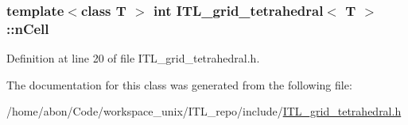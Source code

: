 \hypertarget{classITL__grid__tetrahedral_a4f290e007f6b76fc039de3faf68276df}{
\subsubsection[{nCell}]{\setlength{\rightskip}{0pt plus 5cm}template$<$class T $>$ int {\bf ITL\_\-grid\_\-tetrahedral}$<$ T $>$::{\bf nCell}}}
\label{classITL__grid__tetrahedral_a4f290e007f6b76fc039de3faf68276df}


Definition at line 20 of file ITL\_\-grid\_\-tetrahedral.h.



The documentation for this class was generated from the following file:\begin{DoxyCompactItemize}
\item 
/home/abon/Code/workspace\_\-unix/ITL\_\-repo/include/\hyperlink{ITL__grid__tetrahedral_8h}{ITL\_\-grid\_\-tetrahedral.h}\end{DoxyCompactItemize}
